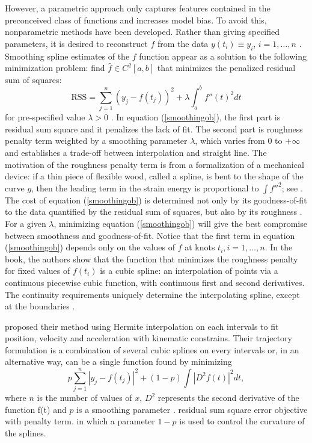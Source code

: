 However, a parametric approach only captures features contained in the preconceived class of functions \cite{yao2005functional} and increases model bias. To avoid this, nonparametric methods have been developed. Rather than giving specified parameters, it is desired to reconstruct $f$ from the data $y(t_i)\equiv y_i$, $i=1, \ldots, n$ \cite{craven1978smoothing}. Smoothing spline estimates of the $f$ function appear as a solution to the following minimization problem: find $\hat{f} \in \mathit{C}^2[a,b]$ that minimizes the penalized residual sum of squares:
\begin{equation}\label{smoothingob}
\mbox{RSS}=\sum_{j=1}^{n}\left(  y_j-f(t_j)\right) ^2+\lambda\int_{a}^{b} f''(t)^2dt
\end{equation}
for pre-specified value $\lambda>0$ \cite{aydin2012smoothing}. In equation (\ref{smoothingob}), the first part is residual sum square and it penalizes the lack of fit. The second part is roughness penalty term weighted by a smoothing parameter $\lambda$, which varies from 0 to $+\infty$ and establishes a trade-off between interpolation and straight line. The motivation of the roughness penalty term is from a formalization of a mechanical device: if a thin piece of flexible wood, called a spline, is bent to the shape of the curve $g$, then the leading term in the strain energy is proportional to $\int f''^2$; see \eg \cite{green1993nonparametric}. The cost of equation (\ref{smoothingob}) is determined not only by its goodness-of-fit to the data quantified by the residual sum of squares, but also by its roughness \cite{schwarz2012geodesy}. For a given $\lambda$, minimizing equation (\ref{smoothingob}) will give the best compromise between smoothness and goodness-of-fit. Notice that the first term in equation (\ref{smoothingob}) depends only on the values of $f$ at knots $t_i, i=1, \ldots, n$. In the book,  the authors \cite{green1993nonparametric} show that the function that minimizes the roughness penalty for fixed values of $f(t_i)$ is a cubic spline: an interpolation of points via a continuous piecewise cubic function, with continuous first and second derivatives. The continuity requirements uniquely determine the interpolating spline, except at the boundaries \cite{sealfon2005smoothing}.

\cite{zhang2013cubic} proposed their method using Hermite interpolation on each intervals to fit position, velocity and acceleration with kinematic constrains. Their trajectory formulation is a combination of several cubic splines on every intervals  or, in an alternative way, can be a single function found by minimizing 
\begin{equation}
p\sum_{j=1}^{n}|y_j-f(t_j)|^2+(1-p)\int |D^2f(t)|^2dt,
\end{equation}
where $n$ is the number of values of $x$, $D^2$ represents the second derivative of the function f(t) and $p$ is a smoothing parameter \cite{castro2006geometric}. 
residual sum square error objective with penalty term\cite{castro2006geometric}.  in which a parameter $1-p$ is used to control the curvature of the splines. 




